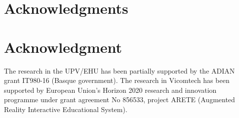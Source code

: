 \documentclass[10pt,journal,compsoc]{IEEEtran}
\begin{document}












\ifCLASSOPTIONcompsoc
  \section*{Acknowledgments}
\else
  \section*{Acknowledgment}
\fi

The research in the UPV/EHU has been partially supported by the ADIAN grant IT980-16 (Basque government).
The research in Vicomtech has been supported by European Union’s Horizon 2020 research and innovation programme under grant agreement No 856533, project ARETE (Augmented Reality Interactive Educational System).

{}


\ifCLASSOPTIONcaptionsoff
  \newpage
\fi





%
%
%
\end{document}
